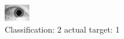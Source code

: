 \begin{figure}[h!]
\begin{center}
\includegraphics[width=0.60\columnwidth]{figures/ID1568_class_2_target_1.png}
\end{center}
\caption{ Classification: 2 actual target: 1}
\label{fig:ID1568_class_2_target_1}
\end{figure}
